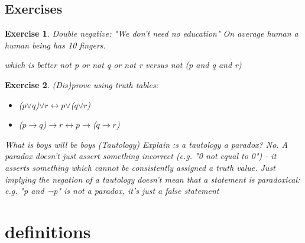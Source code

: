 \documentclass[10pt,a4paper,draft,titlepage,onecolumn]{book}
\newtheorem{exercise}{Exercise}[section]
\begin{document}
\section{Exercises}
\begin{exercise}
Double negative: "We don't need no education"
On average human a human being has 10 fingers.

which is better not p or not q or not r     versus  not (p and q and r)
\end{exercise}
\begin{exercise}
(Dis)prove using truth tables:
\begin{itemize}
\item ($p${$\vee$}$q$){$\vee$}$r${$\leftrightarrow$}$p${$\vee$}($q${$\vee$}$r$)
\item ($p${$\rightarrow$}$q$){$\rightarrow$}$r${$\leftrightarrow$}$p${$\rightarrow$}($q${$\rightarrow$}$r$)
\end{itemize}
What is boys will be boys (Tautology)
Explain :s a tautology a paradox? 
No. A paradox doesn't just assert something incorrect (e.g. "0 not equal to 0") - it asserts something which cannot be consistently assigned a truth value. Just implying the negation of a tautology doesn't mean that a statement is paradoxical: e.g. "p and ¬p" is not a paradox, it's just a false statement


\end{exercise}
\chapter{}
\chapter{definitions}
\printindex
\end{document}
